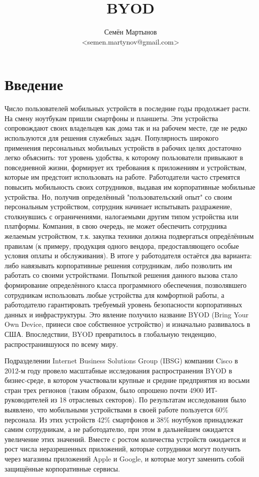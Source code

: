 \documentclass[a4paper, 12pt]{article}		%
\author{Семён Мартынов\\<semen.martynov@gmail.com>}
\title{BYOD}
\begin{document}
\maketitle
\tableofcontents{}


\section{Введение}

Число пользователей мобильных устройств в последние годы продолжает расти. На смену ноутбукам пришли смартфоны и планшеты. Эти устройства сопровождают своих владельцев как дома так и на рабочем месте, где не редко используются для решения служебных задач. Популярность широкого применения персональных мобильных устройств в рабочих целях достаточно легко объяснить: тот уровень удобства, к которому пользователи привыкают в повседневной жизни, формирует их требования к приложениям и устройствам, которые им предстоит использовать на работе. Работодатели часто стремятся повысить мобильность своих сотрудников, выдавая им корпоративные мобильные устройства. Но, получив определённый "пользовательский опыт" со своим персональным устройством, сотрудник начинает испытывать раздражение, столкнувшись с ограничениями, налогаемыми другим типом устройства или платформы. Компания, в свою очередь, не может обеспечить сотрудника желаемым устройством, т.к. закупка техники должна подвергаться опредёлённым правилам (к примеру, продукция одного вендора, предоставляющего особые условия оплаты и обслуживания). В итоге у работодателя остаётся два варианта: либо навязывать корпоративные решения сотрудникам, либо позволить им работать со своими устройствами. Попыткой решения данного вызова стало формирование определённого класса программного обеспечения, позволявшего сотрудникам использовать любые устройства для комфортной работы, а работодателю гарантировать требуемый уровень безопасности корпоративных данных и инфраструктуры. Это явление получило название BYOD (Bring Your Own Device, принеси свое собственное устройство) и изначально развивалось в США. Впоследствии, BYOD превратилось в глобальную тенденцию, распространившуюся по всему миру.

Подразделении Internet Business Solutions Group (IBSG) компании Cisco в 2012-м году провело масштабные исследования распространения BYOD в бизнес-среде, в котором участвовали крупные и средние предприятия из восьми стран трех регионов (таким образом, было опрошено почти 4900 ИТ-руководителей из 18 отраслевых секторов). По результатам исследования \cite{PCWeek30} было выявлено, что мобильными устройствами в своей работе пользуется 60\% персонала. Из этих устройств 42\% смартфонов и 38\% ноутбуков принадлежат самим сотрудникам, а не работодателю, при этом в дальнейшем ожидается увеличение этих значений. Вместе с ростом количества устройств ожидается и рост числа неразрешенных приложений, которые сотрудники могут получить через магазины приложений Apple и Google, и которые могут заменить собой защищённые корпоративные сервисы.
\end{document}
